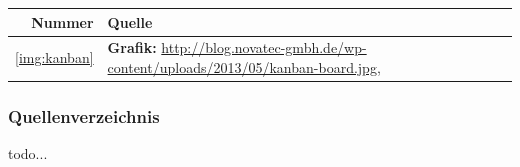 \documentclass[%
	handout
]{beamer}
\begin{document}
		\begin{frame}
			\begin{tabular}{r|p{}}
				\textbf{Nummer}		&	\textbf{Quelle}	\\ \hline
				\ref{img:kanban}	&	\textbf{Grafik:} \url{http://blog.novatec-gmbh.de/wp-content/uploads/2013/05/kanban-board.jpg}, 
		
			\end{tabular}
		\end{frame}
		\begin{frame}
			\frametitle{Quellenverzeichnis}
			todo...
		\end{frame}
	
\end{document}
